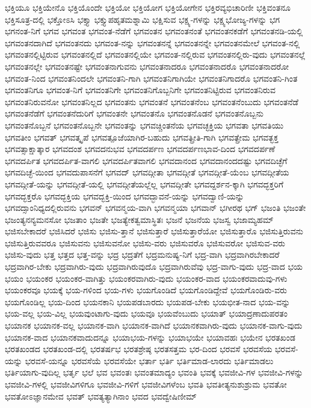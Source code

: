 {ಭಕ್ತಿಯೂ
ಭಕ್ತಿಯೇನೊ
ಭಕ್ತಿಯೊಂದೇ
ಭಕ್ತಿಯೋ
ಭಕ್ತಿಯೋಗ
ಭಕ್ತಿಯೋಗೇನ
ಭಕ್ತಿರವ್ಯಭಿಚಾರಿಣೀ
ಭಕ್ತಿವಂತನೂ
ಭಕ್ತಿಸೂತ್ರ-ದಲ್ಲಿ
ಭಕ್ತೋಽಸಿ
ಭಕ್ತ್ಯಾ
ಭಕ್ತ್ಯುಪಹೃತಮಶ್ನಾಮಿ
ಭಕ್ಷಿಸುವ
ಭಕ್ಷ್ಯ-ಗಳನ್ನು
ಭಕ್ಷ್ಯಭೋಜ್ಯ-ಗಳನ್ನು
ಭಗ
ಭಗನಂತ-ನಿಗೆ
ಭಗವ
ಭಗವಂತ
ಭಗವಂತ-ನೆಡೆಗೆ
ಭಗವಂತನ
ಭಗವಂತನಂತೆ
ಭಗವಂತನಕಡೆಗೆ
ಭಗವಂತನಡಿ-ಯಲ್ಲಿ
ಭಗವಂತನದಾಗಿದೆ
ಭಗವಂತನದು
ಭಗವಂತ-ನನ್ನು
ಭಗವಂತನನ್ನೆ
ಭಗವಂತನನ್ನೇ
ಭಗವಂತನಮೇಲೆ
ಭಗವಂತ-ನಲ್ಲಿ
ಭಗವಂತನಲ್ಲಿಟ್ಟಿರುವ
ಭಗವಂತನಲ್ಲಿದೆ
ಭಗವಂತನಲ್ಲಿಯೇ
ಭಗವಂತ-ನಲ್ಲಿರುವ
ಭಗವಂತನಲ್ಲಿರು-ವುದು
ಭಗವಂತನಲ್ಲೆ
ಭಗವಂತನಲ್ಲೇ
ಭಗವಂತನಷ್ಟೇ
ಭಗವಂತನಾಗುವನು
ಭಗವಂತನಾದರೂ
ಭಗವಂತನಾದರೊ
ಭಗವಂತನಾದರೋ
ಭಗವಂತ-ನಿಂದ
ಭಗವಂತನಿಂದಲೇ
ಭಗವಂತನಿ-ಗಾಗಿ
ಭಗವಂತನಿಗಾಗಿಯೇ
ಭಗವಂತನಿಗಾದರೊ
ಭಗವಂತನಿ-ಗಿಂತ
ಭಗವಂತನಿಗೂ
ಭಗವಂತ-ನಿಗೆ
ಭಗವಂತನಿಗೇ
ಭಗವಂತನಿಗೊಬ್ಬನಿಗೇ
ಭಗವಂತನಿಟ್ಟಿರುವ
ಭಗವಂತನಿರುವ
ಭಗವಂತನಿರುವನೋ
ಭಗವಂತನಿಲ್ಲದ
ಭಗವಂತನು
ಭಗವಂತನೆ
ಭಗವಂತನೆಂಬ
ಭಗವಂತನೆಂಬುದು
ಭಗವಂತನೆಡೆ
ಭಗವಂತನೆಡೆಗೆ
ಭಗವಂತನೆದುರಿಗೆ
ಭಗವಂತನೇ
ಭಗವಂತನೊ
ಭಗವಂತನೊಡನೆ
ಭಗವಂತನೊಬ್ಬನು
ಭಗವಂತನೊಬ್ಬನೆ
ಭಗವಂತನೊಬ್ಬನೇ
ಭಗವಂತನ್ನು
ಭಗವಚ್ಚಿಂತನೆಯ
ಭಗವಚ್ಛಕ್ತಿಯ
ಭಗವತಾ
ಭಗವತಿಯು
ಭಗವತೀಂ
ಭಗವತ್
ಭಗವತ್ಕೃಪೆ
ಭಗವತ್ಪೂಜೆಯಾಗಿರ-ಬಹುದು
ಭಗವತ್ಪ್ರೀತಿ-ಗಾಗಿ
ಭಗವತ್ಪ್ರೇಮ
ಭಗವತ್ಭಕ್ತ
ಭಗವತ್ಸಾಕ್ಷಾತ್ಕಾರ
ಭಗವದಂಶ
ಭಗವದನುಭವ
ಭಗವದರ್ಪಣ
ಭಗವದರ್ಪಣಭಾವ-ದಿಂದ
ಭಗವದರ್ಪಣೆ
ಭಗವದರ್ಪಿತ
ಭಗವದರ್ಪಿತ-ವಾಗಲಿ
ಭಗವದರ್ಪಿತವಾಗಲಿ
ಭಗವದಾನಂದ
ಭಗವದಾನಂದದಷ್ಟು
ಭಗವದಿಚ್ಛೆಗೆ
ಭಗವದಿಚ್ಛೆ-ಯಿಂದ
ಭಗವದುಪಾಸನೆಗೆ
ಭಗವದ್
ಭಗವದ್ಗೀತಾ
ಭಗವದ್ಗೀತೆ
ಭಗವದ್ಗೀತೆ-ಯೆಂಬ
ಭಗವದ್ಗೀತೆಯ
ಭಗವದ್ಗೀತೆ-ಯನ್ನು
ಭಗವದ್ಗೀತೆ-ಯಲ್ಲಿ
ಭಗವದ್ಗೀತೆಯಲ್ಲೆಲ್ಲ
ಭಗವದ್ಗೀತೇ
ಭಗವದ್ದರ್ಶನ-ಕ್ಕಾಗಿ
ಭಗವದ್ಭಕ್ತರಿಗೆ
ಭಗವದ್ಭಕ್ತರೊ
ಭಗವದ್ಭಕ್ತಿಯ
ಭಗವದ್ಭಕ್ತಿ-ಯಿಂದ
ಭಗವದ್ಭಾವನೆ-ಯನ್ನು
ಭಗವದ್ವಾಣಿ-ಯನ್ನು
ಭಗವದ್ಸಾಂನಿಧ್ಯದಲ್ಲಿರುವನು
ಭಗವನ್
ಭಗವನ್ಮಯ-ವಾಗಿ
ಭಗವನ್ಮಯಾ
ಭಗವಾನ್
ಭಗೀರಥ
ಭಗ್
ಭಜಂತಿ
ಭಜಂತೇ
ಭಜಂತ್ಯನನ್ಯಮನಸೋ
ಭಜತಾಂ
ಭಜತೇ
ಭಜತ್ಯೇಕತ್ವಮಾಸ್ಥಿತಃ
ಭಜನೆ
ಭಜನೆಯ
ಭಜಸ್ವ
ಭಜಾಮ್ಯಹಮ್
ಭಜಿಸಬೇಕಾದರೆ
ಭಜಿಸಿದರೆ
ಭಜಿಸು
ಭಜಿಸು-ತ್ತಾನೆ
ಭಜಿಸುತ್ತಾರೆ
ಭಜಿಸುತ್ತಾರೆಯೋ
ಭಜಿಸುತ್ತಾರೊ
ಭಜಿಸುತ್ತಿರುವನು
ಭಜಿಸುತ್ತಿರುವವರೂ
ಭಜಿಸುವನು
ಭಜಿಸುವನೋ
ಭಜಿಸು-ವರು
ಭಜಿಸುವರೊ
ಭಜಿಸುವರೋ
ಭಜಿಸುವ-ವರು
ಭಜಿಸು-ವುದು
ಭತ್ತ
ಭತ್ತದ
ಭತ್ತ-ವನ್ನು
ಭದ್ರ
ಭದ್ರತೆಗೆ
ಭದ್ರಮನುಷ್ಯ-ನಿಗೆ
ಭದ್ರ-ವಾಗಿ
ಭದ್ರವಾಗಿರಬೇಕಾದರೆ
ಭದ್ರವಾಗಿರ-ಬೇಕು
ಭದ್ರವಾಗಿರು-ವುದು
ಭದ್ರವಾಗಿರುವುದೊ
ಭದ್ರವಾಗಿರುವೆವು
ಭದ್ರ-ವಾಗು-ವುದು
ಭದ್ರ-ವಾದ
ಭಯ
ಭಯಂ
ಭಯಂಕರ
ಭಯಂಕರ-ವಾಗಿತ್ತು
ಭಯಂಕರವಾಗಿರು-ವುದು
ಭಯಂಕರ-ವಾದ
ಭಯಂಕರವಾದುವು-ಗಳು
ಭಯಂಕರವೂ
ಭಯಕ್ಕೆ
ಭಯ-ಗಳಿಂದ
ಭಯ-ಗಳು
ಭಯಗೊಂಡಿದೆ
ಭಯಗೊಂಡಿದ್ದೇವೆ
ಭಯಗೊಂಡಿರು-ವರು
ಭಯಗೊಂಡಿಲ್ಲ
ಭಯ-ದಿಂದ
ಭಯನಕಾನಿ
ಭಯಪಡಬಾರದು
ಭಯಪಡ-ಬೇಕು
ಭಯಭೀತ-ನಾದ
ಭಯ-ವನ್ನು
ಭಯ-ವಲ್ಲ
ಭಯ-ವಿಲ್ಲ
ಭಯವುಂಟಾಗು-ವುದು
ಭಯವೂ
ಭಯವೆಂಬುದು
ಭಯಾತ್
ಭಯಾದ್ರಣಾದುಪರತಂ
ಭಯಾನಕ
ಭಯಾನಕ-ವಲ್ಲ
ಭಯಾನಕ-ವಾಗಿ
ಭಯಾನಕ-ವಾಗಿದೆ
ಭಯಾನಕವಾಗಿರು-ವುದು
ಭಯಾನಕ-ವಾಗು-ವುದು
ಭಯಾನಕ-ವಾದ
ಭಯಾನಕವಾದುದನ್ನೂ
ಭಯಾಭಯ-ಗಳನ್ನು
ಭಯಾಭಯೇ
ಭಯಾವಹಃ
ಭಯೇನ
ಭರತಖಂಡ
ಭರತಖಂಡದ
ಭರತಖಂಡ-ದಲ್ಲಿ
ಭರತರ್ಷಭ
ಭರತಶ್ರೇಷ್ಠ
ಭರತಸತ್ತಮ
ಭರ-ದಿಂದ
ಭರವಸೆ
ಭರವಸೆಯ
ಭರವಸೆ-ಯನ್ನು
ಭರವಸೆ-ಯನ್ನೂ
ಭರವಸೆಯೆ
ಭರವಸೆಯೇ
ಭರ್ತಾ
ಭರ್ತಿ
ಭರ್ತಿಮಾಡ-ಲಾರದು
ಭರ್ತಿಮಾಡಲು
ಭರ್ತಿಯಾಗು-ವುದಿಲ್ಲ
ಭರ್ತೃ
ಭಲೆ
ಭವ
ಭವಂತಃ
ಭವಂತಮಾದ್ಯಂ
ಭವಂತಿ
ಭವಕ್ಕೆ
ಭವಜೀವಿ-ಗಳ
ಭವಜೀವಿ-ಗಳನ್ನು
ಭವಜೀವಿ-ಗಳಲ್ಲಿ
ಭವಜೀವಿಗಳಿಗೂ
ಭವಜೀವಿ-ಗಳಿಗೆ
ಭವಜೀವಿಗಳೆಂಬ
ಭವತಿ
ಭವತೀತ್ಯನುಶುಶ್ರುಮ
ಭವತೋ
ಭವತೋಽಜ್ಞಾನಮೇವ
ಭವತ್
ಭವತ್ಯತ್ಯಾಗಿನಾಂ
ಭವದ
ಭವದ್ವೇಷಿಣೀಮ್
}
